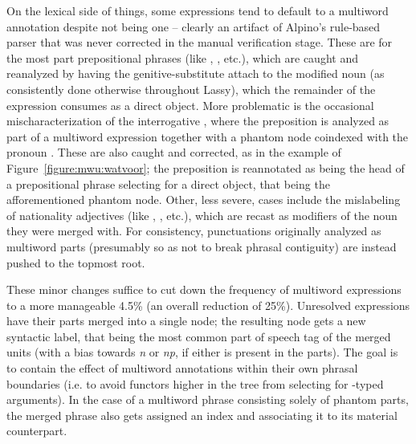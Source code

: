 On the lexical side of things, some expressions tend to default to a multiword annotation despite not being one -- clearly an artifact of Alpino's rule-based parser that was never corrected in the manual verification stage.
These are for the most part prepositional phrases (like , , etc.), which are caught and reanalyzed by having the genitive-substitute  attach to the modified noun (as consistently done otherwise throughout Lassy), which the remainder of the expression consumes as a direct object.
More problematic is the occasional mischaracterization of the interrogative , where the preposition  is analyzed as part of a multiword expression together with a phantom node coindexed with the pronoun .
These are also caught and corrected, as in the example of Figure~\ref{figure:mwu:watvoor}; the preposition is reannotated as being the head of a prepositional phrase selecting for a direct object, that being the afforementioned phantom node.
Other, less severe, cases include the mislabeling of nationality adjectives (like , , etc.), which are recast as modifiers of the noun they were merged with.
For consistency, punctuations originally analyzed as multiword parts (presumably so as not to break phrasal contiguity) are instead pushed to the topmost root.

These minor changes suffice to cut down the frequency of multiword expressions to a more manageable 4.5\% (an overall reduction of 25\%).
Unresolved expressions have their parts merged into a single node; the resulting node gets a new syntactic label, that being the most common part of speech tag of the merged units (with a bias towards \textit{n} or \textit{np}, if either is present in the parts).
The goal is to contain the effect of multiword annotations within their own phrasal boundaries (i.e. to avoid functors higher in the tree from selecting for -typed arguments).
In the case of a multiword phrase consisting solely of phantom parts, the merged phrase also gets assigned an index and associating it to its material counterpart.

